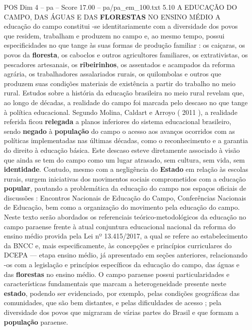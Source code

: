 \begin{textsample}{POS Dim 4 – pa – Score 17.00 – pa/pa\_em\_100.txt}  \label{ex:f4_pos_005}
5.10 A EDUCAÇÃO DO CAMPO, DAS ÁGUAS E DAS \textbf{FLORESTAS} NO ENSINO MÉDIO A educação do campo constitui -se identitariamente com a diversidade dos povos que residem, trabalham e produzem no campo e, ao mesmo tempo, possui especificidades no que tange às suas formas de produção familiar : os caiçaras, os povos da \textbf{floresta}, os caboclos e outros agricultores familiares, os extrativistas, os pescadores artesanais, os \textbf{ribeirinhos}, os assentados e acampados da reforma agrária, os trabalhadores assalariados rurais, os quilombolas e outros que produzem suas condições materiais de existência a partir do trabalho no meio rural.
Estudos sobre a história da educação brasileira no meio rural revelam que, ao longo de décadas, a realidade do campo foi marcada pelo descaso no que tange à política educacional.
Segundo Molina, Caldart e Arroyo ( 2011 ), a realidade referida ficou \textbf{relegada} a planos inferiores do sistema educacional brasileiro, sendo \textbf{negado} à \textbf{população} do campo o acesso aos avanços ocorridos com as políticas implementadas nas últimas décadas, como o reconhecimento e a garantia do direito à educação básica.
Este descaso esteve diretamente associado à visão que ainda se tem do campo como um lugar atrasado, sem cultura, sem vida, sem \textbf{identidade}.
Contudo, mesmo com a negligência do \textbf{Estado} em relação às escolas rurais, surgem iniciativas dos movimentos sociais comprometidos com a educação \textbf{popular}, pautando a problemática da educação do campo nos espaços oficiais de discussões : Encontros Nacionais de Educação do Campo, Conferências Nacionais de Educação, bem como a organização do movimento pela educação do campo.
Neste texto serão abordados os referenciais teórico-metodológicos da educação no campo paraense frente à atual conjuntura educacional nacional da reforma do ensino médio provida pela Lei nº 13.415/2017, a qual se refere ao estabelecimento da BNCC e, mais especificamente, às concepções e princípios curriculares do DCEPA — etapa ensino médio, já apresentado em seções anteriores, relacionando -os com a legislação e princípios específicos da educação do campo, das águas e das \textbf{florestas} no ensino médio.
O campo paraense possui particularidades e características fundamentais que marcam a heterogeneidade presente neste \textbf{estado}, podendo ser evidenciado, por exemplo, pelas condições geográficas das comunidades, que são bem distantes, e pelas dificuldades de acesso ; pela diversidade dos povos que migraram de várias partes do Brasil e que formam a \textbf{população} paraense.

\end{textsample}
